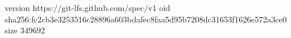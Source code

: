 version https://git-lfs.github.com/spec/v1
oid sha256:fc2cb3e3253516c28896a603bdafec8faa5d95b7208dc31653f1626e572a3ce0
size 349692
